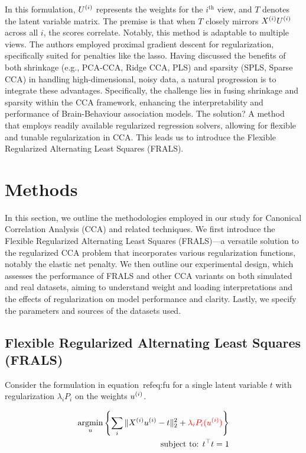 In this formulation, \(U^{(i)}\) represents the weights for the $i^{\text{th}}$ view, and \(T\) denotes the latent variable matrix. The premise is that when \(T\) closely mirrors \(X^{(i)} U^{(i)}\) across all \(i\), the scores correlate.
Notably, this method is adaptable to multiple views.
The authors employed proximal gradient descent for regularization, specifically suited for penalties like the lasso.
Having discussed the benefits of both shrinkage (e.g., PCA-CCA, Ridge CCA, PLS) and sparsity (SPLS, Sparse CCA) in handling high-dimensional, noisy data, a natural progression is to integrate these advantages.
Specifically, the challenge lies in fusing shrinkage and sparsity within the CCA framework, enhancing the interpretability and performance of Brain-Behaviour association models.
The solution?
A method that employs readily available regularized regression solvers, allowing for flexible and tunable regularization in CCA.
This leads us to introduce the Flexible Regularized Alternating Least Squares (FRALS).

\section{Methods}

In this section, we outline the methodologies employed in our study for Canonical Correlation Analysis (CCA) and related techniques.
We first introduce the Flexible Regularized Alternating Least Squares (FRALS)—a versatile solution to the regularized CCA problem that incorporates various regularization functions, notably the elastic net penalty\cite{zou2005regularization}.
We then outline our experimental design, which assesses the performance of FRALS and other CCA variants on both simulated and real datasets, aiming to understand weight and loading interpretations and the effects of regularization on model performance and clarity.
Lastly, we specify the parameters and sources of the datasets used.

\subsection{Flexible Regularized Alternating Least Squares (FRALS)}\label{subsec:flexible-regularized-alternating-least
-squares-(frals)}

Consider the formulation in equation~ref{eq:fu} for a single latent variable \(t\) with regularization $\lambda_i P_i$ on the weights \(u^{(i)}\).

\begin{align}
    \underset{u}{\mathrm{argmin}}\left\{\sum_i \|X^{(i)} u^{(i)} - t\|_2^2 + \textcolor{red}{\lambda_i P_i(u^{(i)})} \right\}\\
    \text{subject to: }t^\top t = 1\\
\end{align}

